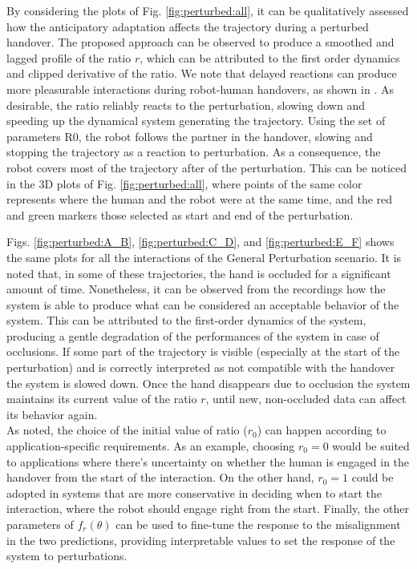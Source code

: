 \documentclass[lettersize,journal]{IEEEtran}
\begin{document}
\noindent
By considering the plots of Fig. \ref{fig:perturbed:all}, it can be qualitatively assessed how the anticipatory adaptation affects the trajectory during a perturbed handover.
The proposed approach can be observed to produce a smoothed and lagged profile of the ratio $r$, which can be attributed to the first order dynamics and clipped derivative of the ratio.
We note that delayed reactions can produce more pleasurable interactions during robot-human handovers, as shown in \cite{pan_fast_2019}.
As desirable, the ratio reliably reacts to the perturbation, slowing down and speeding up the dynamical system generating the trajectory.
Using the set of parameters R0, the robot follows the partner in the handover, slowing and stopping the trajectory as a reaction to perturbation.
As a consequence, the robot covers most of the trajectory after of the perturbation.
This can be noticed in the 3D plots of Fig. \ref{fig:perturbed:all}, where points of the same color represents where the human and the robot were at the same time, and the red and green markers those selected as start and end of the perturbation.

Figs. \ref{fig:perturbed:A_B}, \ref{fig:perturbed:C_D}, and \ref{fig:perturbed:E_F} shows the same plots for all the interactions of the General Perturbation scenario.
It is noted that, in some of these trajectories, the hand is occluded for a significant amount of time.
Nonetheless, it can be observed from the recordings how the system is able to produce what can be considered an acceptable behavior of the system.
This can be attributed to the first-order dynamics of the system, producing a gentle degradation of the performances of the system in case of occlusions. 
If some part of the trajectory is visible (especially at the start of the perturbation) and is correctly interpreted as not compatible with the handover the system is slowed down.
Once the hand disappears due to occlusion the system maintains its current value of the ratio $r$, until new, non-occluded data can affect its behavior again.
\\

\noindent
As noted, the choice of the initial value of ratio ($r_0$) can happen according to application-specific requirements.
As an example, choosing $r_0=0$ would be suited to applications where there's uncertainty on whether the human is engaged in the handover from the start of the interaction.
On the other hand, $r_0=1$ could be adopted in systems that are more conservative in deciding when to start the interaction, where the robot should engage right from the start.
Finally, the other parameters of $f_r(\theta)$ can be used to fine-tune the response to the misalignment in the two predictions, providing interpretable values to set the response of the system to perturbations. 
\end{document}
